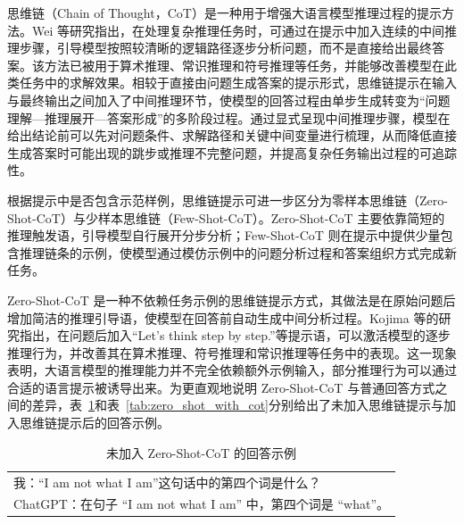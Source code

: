 思维链（Chain of Thought，CoT）是一种用于增强大语言模型推理过程的提示方法。Wei 等研究指出，在处理复杂推理任务时，可通过在提示中加入连续的中间推理步骤，引导模型按照较清晰的逻辑路径逐步分析问题，而不是直接给出最终答案。该方法已被用于算术推理、常识推理和符号推理等任务，并能够改善模型在此类任务中的求解效果\cite{Wei2022ChainOfThoughtPrompting}。相较于直接由问题生成答案的提示形式，思维链提示在输入与最终输出之间加入了中间推理环节，使模型的回答过程由单步生成转变为“问题理解—推理展开—答案形成”的多阶段过程。通过显式呈现中间推理步骤，模型在给出结论前可以先对问题条件、求解路径和关键中间变量进行梳理，从而降低直接生成答案时可能出现的跳步或推理不完整问题，并提高复杂任务输出过程的可追踪性。

根据提示中是否包含示范样例，思维链提示可进一步区分为零样本思维链（Zero-Shot-CoT）与少样本思维链（Few-Shot-CoT）。Zero-Shot-CoT 主要依靠简短的推理触发语，引导模型自行展开分步分析；Few-Shot-CoT 则在提示中提供少量包含推理链条的示例，使模型通过模仿示例中的问题分析过程和答案组织方式完成新任务。

Zero-Shot-CoT 是一种不依赖任务示例的思维链提示方式，其做法是在原始问题后增加简洁的推理引导语，使模型在回答前自动生成中间分析过程。Kojima 等的研究指出，在问题后加入“Let’s think step by step.”等提示语，可以激活模型的逐步推理行为，并改善其在算术推理、符号推理和常识推理等任务中的表现\cite{Kojima2022ZeroShotReasoners}。这一现象表明，大语言模型的推理能力并不完全依赖额外示例输入，部分推理行为可以通过合适的语言提示被诱导出来。为更直观地说明 Zero-Shot-CoT 与普通回答方式之间的差异，表~\ref{tab:zero_shot_no_cot}和表~\ref{tab:zero_shot_with_cot}分别给出了未加入思维链提示与加入思维链提示后的回答示例。

\begin{table}[htbp]
  \centering
  \caption{未加入 Zero-Shot-CoT 的回答示例}
  \label{tab:zero_shot_no_cot}
  {\small
  \begin{tabular}{p{}}
    \toprule
    我：“I am not what I am”这句话中的第四个词是什么？ \\[4pt]
    ChatGPT：在句子 “I am not what I am” 中，第四个词是 ``what''。 \\
    \bottomrule
  \end{tabular}}
\end{table}

